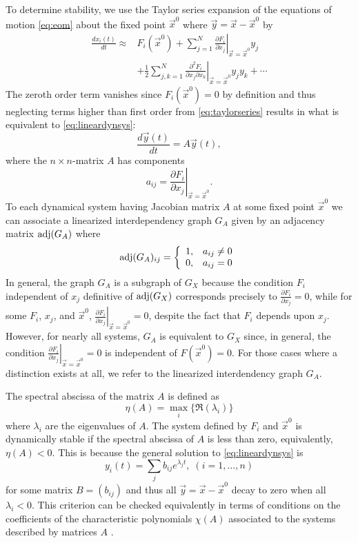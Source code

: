 To determine stability, we use the Taylor series expansion of the equations of motion \ref{eq:eom} about the fixed point $\vec{x}^0$ where $\vec{y} = \vec{x} - \vec{x}^0$ by
\begin{equation}\label{eq:taylorseries}
\begin{aligned}
\frac{dx_i(t)}{dt} \approx & F_i(\vec{x}^0)
+ \sum_{j=1}^{N} \left. \frac{\partial F_i}{\partial x_j} \right|_{\vec{x} = \vec{x}^0} y_j\\
& + \frac{1}{2}\sum_{j,k=1}^{N} \left. \frac{\partial^2 F_i}{\partial x_j \partial x_k} \right|_{\vec{x} = \vec{x}^0} y_j y_k + \cdots
\end{aligned}
\end{equation}
The zeroth order term vanishes since $F_i(\vec{x}^0)=0$ by definition and thus neglecting terms higher than first order from \ref{eq:taylorseries} results in what is equivalent to \ref{eq:lineardynsys}:
\begin{equation*}
\frac{d\vec{y}(t)}{dt} = A \vec{y}(t),
\end{equation*}
where the $n \times n$-matrix $A$ has components
$$
a_{ij} = \left. \frac{\partial F_i}{\partial x_j} \right|_{\vec{x} = \vec{x}^0}.
$$
To each dynamical system having Jacobian matrix $A$ at some fixed point $\vec{x}^0$ we can associate a linearized interdependency graph $G_A$ given by an adjacency matrix $\mathrm{adj}(G_A)$ where
 \begin{displaymath}
   \mathrm{adj}(G_A)_{ij} = \left\{
     \begin{array}{lr}
       1, & a_{ij} \neq 0\\
       0, & a_{ij} = 0
     \end{array}
   \right.
\end{displaymath}
In general, the graph $G_A$ is a subgraph of $G_X$ because the condition $F_i$ independent of $x_j$ definitive of $\mathrm{adj}(G_X)$ corresponds precisely to $\frac{\partial F_i}{\partial x_j}=0$, while for some $F_i$, $x_j$, and $\vec{x}^0$, $\left. \frac{\partial F_i}{\partial x_j} \right|_{\vec{x} = \vec{x}^0} = 0$, despite the fact that $F_i$ depends upon $x_j$. However, for nearly all systems, $G_A$ is equivalent to $G_X$ since, in general, the condition $\left. \frac{\partial F_i}{\partial x_j} \right|_{\vec{x} = \vec{x}^0} = 0$ is independent of $F(\vec{x}^0)=0$. For those cases where a distinction exists at all, we refer to the linearized interdendency graph $G_A$.

The spectral abscissa of the matrix $A$ is defined as
$$
\eta(A) = \max_i \{\Re(\lambda_i)\}
$$
where $\lambda_i$ are the eigenvalues of $A$. The system defined by $F_i$ and $\vec{x}^0$ is dynamically stable if the spectral abscissa of $A$ is less than zero, equivalently, $\eta(A) < 0$. This is because the general solution to \ref{eq:lineardynsys} is
$$
y_i(t) = \sum_j b_{ij} e^{\lambda_j t}, \; (i=1,\ldots,n)
$$
for some matrix $B=(b_{ij})$ and thus all $\vec{y} = \vec{x} - \vec{x}^0$ decay to zero when all $\lambda_i < 0$. This criterion can be checked equivalently in terms of conditions on the coefficients of the characteristic polynomials $\chi(A)$ associated to the systems described by matrices $A$ \cite{Gantmacher1959}.

